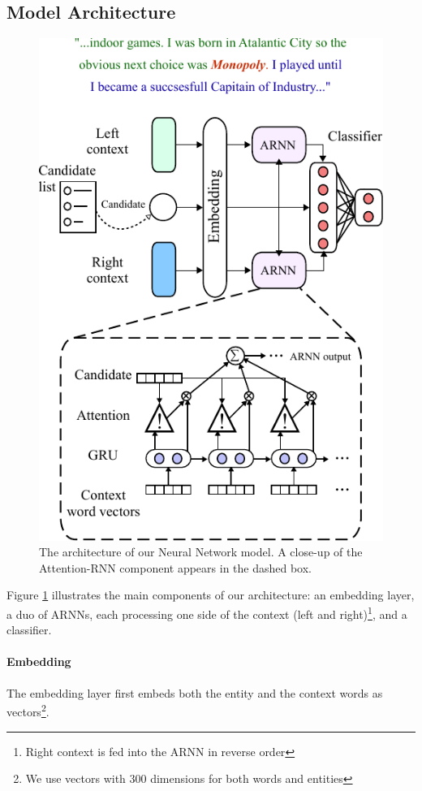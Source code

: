 \documentclass[11pt]{article}
\begin{document}
	\subsection{Model Architecture}
	
	\begin{figure}
		\centering
		\includegraphics[scale=1]{diagrams/model_color_v4.pdf}
		\caption{The architecture of our Neural Network model. A close-up of the Attention-RNN component appears in the dashed box.}
		\label{fig:arnn}
	\end{figure}	
	
	Figure \ref{fig:arnn} illustrates the main components of our architecture: an embedding layer, a duo of ARNNs, each processing one side of the context (left and right)\footnote{Right context is fed into the ARNN in reverse order}, and a classifier. 
	
	
	\paragraph{Embedding}
	The embedding layer first embeds both the entity and the context words as vectors\footnote{We use vectors with 300 dimensions for both words and entities}. 
	
\end{document}
